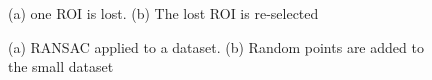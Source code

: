 \documentclass[journal]{IEEEtran}
\begin{document}
\begin{figure}[!t]
	\centering
{}
\hfill
{} 
\caption{(a) one ROI is lost. (b) The lost ROI is re-selected}
\label{ReSelectROI}
\end{figure}
\begin{figure}[!t]
	\centering
{}
\hfill
{} 
\caption{(a) RANSAC applied to a dataset. (b) Random points are added to the small dataset}
\label{methodsRANSAC_repopulate}
\end{figure}
\end{document}
